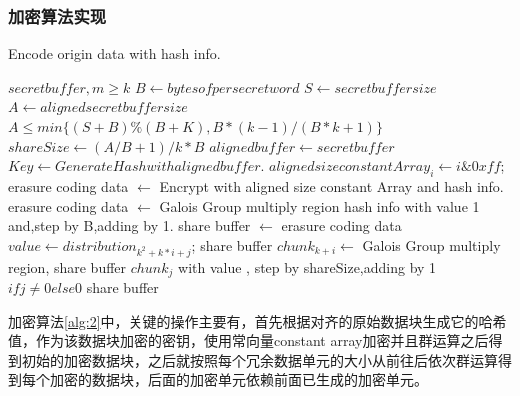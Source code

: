 \subsubsection{加密算法实现}
 \begin{algorithm}[H]
 	\caption{Encode origin data with hash info.}
 	\label{alg:2}
 	\begin{algorithmic}
 		\REQUIRE $secret buffer,m \ge k$
 		\STATE $B \gets bytesof per secret word$
 		\STATE $S \gets secret buffer size$
 		\STATE $A \gets aligned secret buffer size$
 		\ENSURE $A \le min\{(S+B) \% (B+K), B*(k-1) / (B*k+1)\}$ 
 		\STATE $shareSize \gets (A / B + 1) / k * B$
 		\STATE $aligned buffer \gets secret buffer$
 		\STATE $Key \gets Generate Hash with aligned buffer$.
 		\STATE $aligned size constant Array_i \gets i\&0xff$;
 		\ENDFOR
 		\STATE erasure coding data $\gets$ Encrypt with aligned size constant Array and hash info.
 		\STATE erasure coding data $\gets$ Galois Group multiply region hash info with value 1 and,step by B,adding by 1.
 		\STATE share buffer $\gets$ erasure coding data
 		\STATE $value \gets distribution_{k^2+k*i+j}$;
 		\STATE
 		share buffer $chunk_{k+i} \gets$ Galois Group multiply region,
 		share buffer $chunk_j$ with value ,
 		step by shareSize,adding by 1 $if j \neq 0 else 0$
 		\ENDFOR
 		\ENDFOR
 		\RETURN share buffer
 	\end{algorithmic}
 \end{algorithm}
加密算法\autoref{alg:2}中，关键的操作主要有，首先根据对齐的原始数据块生成它的哈希值，作为该数据块加密的密钥，使用常向量constant array加密并且群运算之后得到初始的加密数据块，之后就按照每个冗余数据单元的大小从前往后依次群运算得到每个加密的数据块，后面的加密单元依赖前面已生成的加密单元。
